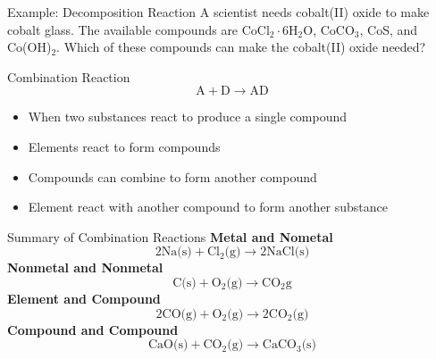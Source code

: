 \documentclass[11pt]{beamer}
\begin{document}
\begin{frame}{Example: Decomposition Reaction}
  A scientist needs cobalt(II) oxide to make cobalt glass. The available
  compounds are CoCl$_2\cdot 6$H$_2$O, CoCO$_3$, CoS, and Co(OH)$_2$. Which
  of these compounds can make the cobalt(II) oxide needed?
\end{frame}

\begin{frame}{Combination Reaction}
  \begin{equation}
    \text{A} + \text{D} \rightarrow \text{AD}
  \end{equation}

  \begin{itemize}
  \item When two substances react to produce a single compound
  \item Elements react to form compounds
  \item Compounds can combine to form another compound
  \item Element react with another compound to form another
    substance
  \end{itemize}
\end{frame}

\begin{frame}{Summary of Combination Reactions}
  \textbf{Metal and Nometal}
  \begin{equation}
    2 \text{Na(s)} + \text{Cl}_2\text{(g)} \rightarrow 2 \text{NaCl(s)}
  \end{equation}
  \textbf{Nonmetal and Nonmetal}
    \begin{equation}
      \text{C(s)} + \text{O}_2\text{(g)} \rightarrow \text{CO}_2\text{g}
    \end{equation}
  \textbf{Element and Compound}
    \begin{equation}
      2 \text{CO(g)} + \text{O}_2\text{(g)} \rightarrow 2\text{CO}_2\text{(g)}
    \end{equation}
  \textbf{Compound and Compound}
    \begin{equation}
      \text{CaO(s)} + \text{CO}_2\text{(g)} \rightarrow \text{CaCO}_3\text{(s)}
    \end{equation}
\end{frame}
\end{document}

